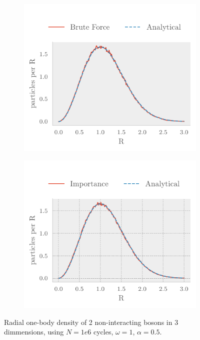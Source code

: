 \begin{figure}[ht]
	\begin{subfigure}{\columnwidth}
		\centering
		\includegraphics[]{figures/density3.pdf}
		\label{fig:sfig1}
	\end{subfigure}%
	\begin{subfigure}{\columnwidth}
		\centering
		\includegraphics[]{figures/density4.pdf}
		\label{fig:sfig2}
	\end{subfigure}
	\caption{Radial one-body density of 2 non-interacting bosons in 3 dimmensions, using $N = 1e6$ cycles, $\omega = 1$, $\alpha = 0.5$.}
	\label{fig:2 part 3 dim density}
\end{figure}

